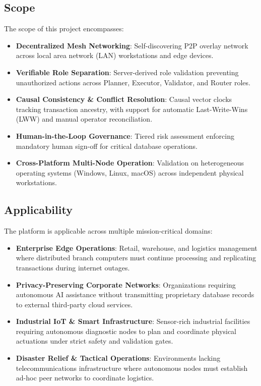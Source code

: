 \documentclass[12pt,a4paper]{report}
\begin{document}
\subsection{Scope}
The scope of this project encompasses:
\begin{itemize}[leftmargin=*,itemsep=2pt]
    \item \textbf{Decentralized Mesh Networking}: Self-discovering P2P overlay network across local area network (LAN) workstations and edge devices.
    \item \textbf{Verifiable Role Separation}: Server-derived role validation preventing unauthorized actions across Planner, Executor, Validator, and Router roles.
    \item \textbf{Causal Consistency \& Conflict Resolution}: Causal vector clocks tracking transaction ancestry, with support for automatic Last-Write-Wins (LWW) and manual operator reconciliation.
    \item \textbf{Human-in-the-Loop Governance}: Tiered risk assessment enforcing mandatory human sign-off for critical database operations.
    \item \textbf{Cross-Platform Multi-Node Operation}: Validation on heterogeneous operating systems (Windows, Linux, macOS) across independent physical workstations.
\end{itemize}

\subsection{Applicability}
The platform is applicable across multiple mission-critical domains:
\begin{itemize}[leftmargin=*,itemsep=2pt]
    \item \textbf{Enterprise Edge Operations}: Retail, warehouse, and logistics management where distributed branch computers must continue processing and replicating transactions during internet outages.
    \item \textbf{Privacy-Preserving Corporate Networks}: Organizations requiring autonomous AI assistance without transmitting proprietary database records to external third-party cloud services.
    \item \textbf{Industrial IoT \& Smart Infrastructure}: Sensor-rich industrial facilities requiring autonomous diagnostic nodes to plan and coordinate physical actuations under strict safety and validation gates.
    \item \textbf{Disaster Relief \& Tactical Operations}: Environments lacking telecommunications infrastructure where autonomous nodes must establish ad-hoc peer networks to coordinate logistics.
\end{itemize}
\end{document}
